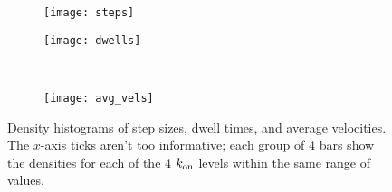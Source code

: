 \documentclass{article}
\newcommand{\tn}{\textnormal}
\begin{document}
\begin{figure}
  \centering
  \begin{subfigure}{0.49\textwidth}
    \texttt{[image: steps]}
  \end{subfigure}
  \hfill
 \begin{subfigure}{0.49\textwidth}
   \texttt{[image: dwells]}
 \end{subfigure}
 \\
 \begin{subfigure}{0.49\textwidth}
   \texttt{[image: avg\_vels]}
 \end{subfigure}
  \caption{Density histograms of step sizes, dwell times, and average
    velocities. The $x$-axis ticks aren't too informative; each group
    of 4 bars show the densities for each of the 4 $k_\tn{on}$ levels
    within the same range of values.} 
  \label{fig:other-data}
\end{figure}



\end{document}
